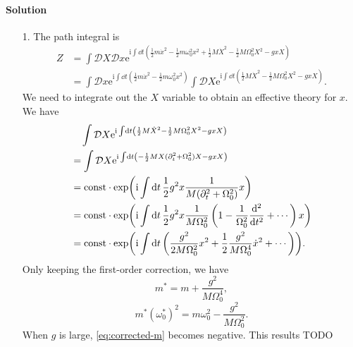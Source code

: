 \documentclass[hyperref, a4paper]{article}
\newcommand*{\ii}{\mathrm{i}}
\newcommand*{\ee}{\mathrm{e}}
\newcommand*{\const}{\mathrm{const}}
\newcommand*{\fd}[1]{\mathcal{D} #1}
\begin{document}
\paragraph{Solution} \begin{itemize}
\item[1.] The path integral is 
\begin{equation}
    \begin{aligned}
        Z &= \int \fd{X} \fd{x} \ee^{\ii \int \dd{t} \left(
            \frac{1}{2} m \dot{x}^2-\frac{1}{2} m \omega_0^2 x^2
            +\frac{1}{2} M \dot{X}^2-\frac{1}{2} M \Omega_0^2 X^2-g x X
        \right)} \\
        &= \int \fd{x} \ee^{\ii \int \dd{t} \left( \frac{1}{2} m \dot{x}^2-\frac{1}{2} m \omega_0^2 x^2 \right)}
        \int \fd{X} \ee^{\ii \int \dd{t} \left(
            \frac{1}{2} M \dot{X}^2-\frac{1}{2} M \Omega_0^2 X^2-g x X
        \right)} .
    \end{aligned}
    \label{eq:integrate-x-big-x}
\end{equation}
We need to integrate out the $X$ variable to obtain an effective theory for $x$.
We have 
\[
    \begin{aligned}
        &\quad \int \fd{X} \ee^{\ii \int \dd{t} \left(
            \frac{1}{2} M \dot{X}^2-\frac{1}{2} M \Omega_0^2 X^2-g x X
        \right)} \\
        &= \int \fd{X} \ee^{\ii \int \dd{t} \left(
            - \frac{1}{2} M X (\partial_t^2 + \Omega_0^2) X -g x X
        \right)}  \\
        &= \const \cdot \exp(\ii \int \dd{t} \frac{1}{2} g^2 x \frac{1}{M (\partial_t^2 + \Omega_0^2)} x) \\
        &= \const \cdot \exp(\ii \int \dd{t} \frac{1}{2} g^2 x \frac{1}{M \Omega_0^2} 
        \left( 1 - \frac{1}{\Omega_0^2} \dv[2]{t} + \cdots \right) x) \\
        &= \const \cdot \exp(\ii \int \dd{t} \left(
            \frac{g^2}{2 M \Omega_0^2} x^2 
            + \frac{1}{2} \frac{g^2}{M \Omega_0^4} \dot{x}^2 + \cdots
        \right)) .
    \end{aligned}
\]
Only keeping the first-order correction, we have 
\begin{equation}
    m^* = m + \frac{g^2}{M \Omega_0^4},
\end{equation}
\begin{equation}
    m^* (\omega_0^*)^2 = m \omega_0^2 - \frac{g^2}{M \Omega_0^2}.
    \label{eq:corrected-m}
\end{equation}
When $g$ is large, \eqref{eq:corrected-m} becomes negative.
This results TODO


\end{itemize}
\end{document}
